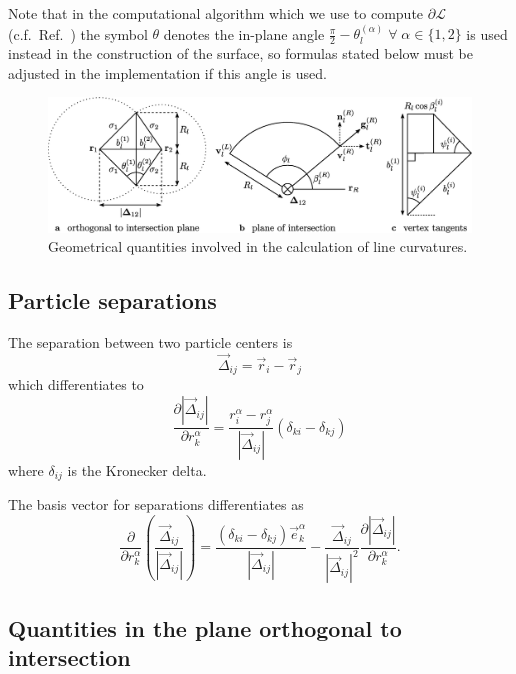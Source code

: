 \documentclass[11pt,twoside]{report}
\begin{document}
Note that in the computational algorithm which we use to compute $\partial\mathcal{L}$ (c.f.\ Ref.\ \cite{KleninJCC2011}) the symbol $\theta$ denotes the in-plane angle $\frac{\pi}{2} - \theta_l^{(\alpha)} \; \forall \; \alpha \in \{1,2\}$ is used instead in the construction of the surface, so formulas stated below must be adjusted in the implementation if this angle is used.

\begin{figure}
  \includegraphics[width=\linewidth,outer]{curvature-geometry}
  \caption{Geometrical quantities involved in the calculation of line curvatures.}
  \label{fig:curvature-geometry}
\end{figure}

\subsection{Particle separations}

The separation between two particle centers is
\begin{equation}
  \vec{\Delta}_{ij} = \vec{r}_i - \vec{r}_j
\end{equation}
which differentiates to
\begin{equation}
  \frac{\partial |\vec{\Delta}_{ij}|}{\partial r_k^\alpha} =
  \frac{r_i^\alpha - r_j^\alpha}{|\vec{\Delta}_{ij}|} (\delta_{ki} - \delta_{kj})
\end{equation}
where $\delta_{ij}$ is the Kronecker delta.

The basis vector for separations differentiates as
\begin{equation}
  \frac{\partial}{\partial r_k^\alpha}
  \left( \frac{\vec{\Delta}_{ij}}{|\vec{\Delta}_{ij}|} \right) =
  \frac{(\delta_{ki} - \delta_{kj}) \vec{e}_k^\alpha}{|\vec{\Delta}_{ij}|}
  - \frac{\vec{\Delta}_{ij}}{|\vec{\Delta}_{ij}|^2}
  \frac{\partial |\vec{\Delta}_{ij}|}{\partial r_k^\alpha}.
\end{equation}

\subsection{Quantities in the plane orthogonal to intersection}
\end{document}
